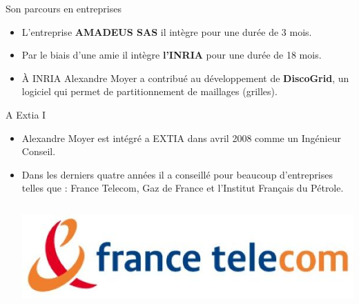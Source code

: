 \documentclass[xcolor=dvipsnames]{beamer}
\begin{document}
\begin{frame}{Son parcours en entreprises}
\begin{itemize}[<+-| alert@+>]
    \item L'entreprise \textbf{AMADEUS SAS} il intègre pour une durée de 3 mois.
    \item Par le biais d'une amie il intègre \textbf{l'INRIA} pour une durée de 18
mois.
	\item \`A INRIA Alexandre Moyer a contribué au développement de \textbf{DiscoGrid}, un logiciel qui permet
de partitionnement de maillages (grilles).
\end{itemize}
\end{frame}

\begin{frame}{A Extia I}
\begin{itemize}
    \item <+-| alert@+> Alexandre Moyer est intégré a EXTIA dans avril 2008 comme un Ingénieur
Conseil.
    \item <+-| alert@+> Dans les derniers quatre années il a conseillé pour beaucoup d'entreprises
telles que : France Telecom, Gaz de France et l'Institut Français du Pétrole.
\begin{columns}
  \begin{column}{0.5\textwidth}
    \centerline{\includegraphics[scale=0.2]{img/francetelecom.jpeg}}
  \end{column}


\end{columns}
\end{itemize}
\end{frame}
\end{document}
